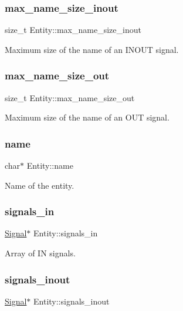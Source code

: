 \subsubsection{\texorpdfstring{max\_name\_size\_inout}{max\_name\_size\_inout}}
{\footnotesize\ttfamily size\+\_\+t Entity\+::max\+\_\+name\+\_\+size\+\_\+inout}

Maximum size of the name of an I\+N\+O\+UT signal. \mbox{\label{struct_entity_ade510913e1937e285e677c2b281cb09e}} 
\subsubsection{\texorpdfstring{max\_name\_size\_out}{max\_name\_size\_out}}
{\footnotesize\ttfamily size\+\_\+t Entity\+::max\+\_\+name\+\_\+size\+\_\+out}

Maximum size of the name of an O\+UT signal. \mbox{\label{struct_entity_a861f653e2ffbe97c0deed7ab85eb7ce6}} 
\subsubsection{\texorpdfstring{name}{name}}
{\footnotesize\ttfamily char$\ast$ Entity\+::name}

Name of the entity. \mbox{\label{struct_entity_a52dafc8055e7c6c1b21520fad2d703b2}} 
\subsubsection{\texorpdfstring{signals\_in}{signals\_in}}
{\footnotesize\ttfamily \mbox{\hyperlink{struct_signal}{Signal}}$\ast$ Entity\+::signals\+\_\+in}

Array of IN signals. \mbox{\label{struct_entity_a3a7a0540c9a581600cae6cb8880d4175}} 
\subsubsection{\texorpdfstring{signals\_inout}{signals\_inout}}
{\footnotesize\ttfamily \mbox{\hyperlink{struct_signal}{Signal}}$\ast$ Entity\+::signals\+\_\+inout}


